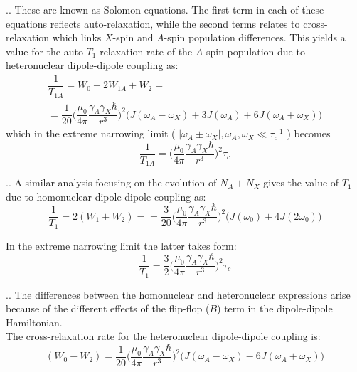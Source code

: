 \documentclass[handout]{beamer}
\begin{document}
\begin{frame}{\thesection.\thesubsection. \insertsubsection}
  These are known as \alert{Solomon equations}. The first term in each of these equations reflects \alert{auto-relaxation}, while the second terms relates to \alert{cross-relaxation} which links $X$-spin and $A$-spin population differences. This yields a value for the auto $T_1$-relaxation rate of the $A$ spin population due to heteronuclear dipole-dipole coupling as:
  \begin{multline}
   \dfrac{1}{T_{1A}} = W_0 + 2W_{1A} + W_2 = \\
   = \dfrac{1}{20} \Big(  \dfrac{\mu_0}{4 \pi} \dfrac{\gamma_A \gamma_X \hbar}{r^3} \Big)^2 \big( J(\omega_A - \omega_X) + 3 J(\omega_A) + 6J(\omega_A + \omega_X) \big)
  \end{multline}
  which in the extreme narrowing limit (  $\mid \omega_A \pm \omega_X \mid, \omega_A, \omega_X  \ll \tau_c^{-1}$ ) becomes
  \begin{equation}
    \dfrac{1}{T_{1A}} = \Big(  \dfrac{\mu_0}{4 \pi} \dfrac{\gamma_A \gamma_X \hbar}{r^3} \Big)^2 \tau_c
  \end{equation}

\end{frame}


\begin{frame}{\thesection.\thesubsection. \insertsubsection}
   A similar analysis focusing on the evolution of $N_A + N_X$ gives the value of $T_1$ due to homonuclear dipole-dipole coupling as:
 \begin{equation}
 \dfrac{1}{T_{1}} = 2 (W_1 + W_2) = 
 = \dfrac{3}{20} \Big(  \dfrac{\mu_0}{4 \pi} \dfrac{\gamma_A \gamma_X \hbar}{r^3} \Big)^2 \big( J(\omega_0) + 4 J(2 \omega_0)  \big)
 \end{equation}


  In the extreme narrowing limit the latter takes form:
  \begin{equation}
     \dfrac{1}{T_1} = \dfrac{3}{2}  \Big(  \dfrac{\mu_0}{4 \pi} \dfrac{\gamma_A \gamma_X \hbar}{r^3} \Big)^2 \tau_c
  \end{equation}
\end{frame}


\begin{frame}{\thesection.\thesubsection. \insertsubsection}
    The differences between the homonuclear and heteronuclear expressions arise because of the different effects of the flip-flop ($B$) term in the dipole-dipole Hamiltonian. \\
   The cross-relaxation rate for the heteronuclear dipole-dipole coupling is:
   \begin{equation}
   (W_0 - W_2) = \dfrac{1}{20} \Big(  \dfrac{\mu_0}{4 \pi} \dfrac{\gamma_A \gamma_X \hbar}{r^3} \Big)^2 \big(  J(\omega_A - \omega_X) - 6 J( \omega_A + \omega_X )  \big)
   \end{equation}   
\end{frame}
\end{document}
